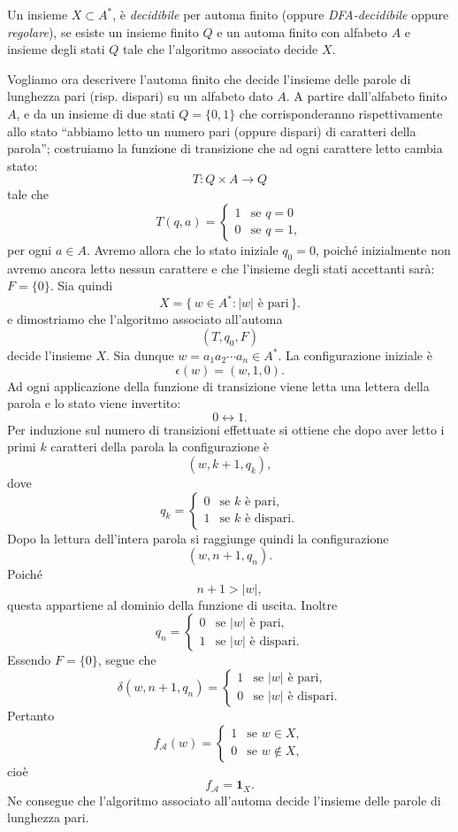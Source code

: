 \begin{defi}\label{def:5}
Un insieme $X\subset A^*$, è \textit{decidibile} per automa finito (oppure \textit{DFA-decidibile} oppure \textit{regolare}), se esiste un insieme finito $Q$ e un automa finito con alfabeto $A$ e insieme degli stati $Q$ tale che l'algoritmo associato decide $X$.
\end{defi}
\begin{exam}\label{ex: parole lunghezze pari}
Vogliamo ora descrivere l'automa finito che decide l'insieme delle parole di lunghezza pari (risp. dispari) su un alfabeto dato $A$.
A partire dall'alfabeto finito $A$, e da un insieme di due stati $Q=\{0,1\}$ che corrisponderanno rispettivamente allo stato ``abbiamo letto un numero pari (oppure dispari) di caratteri della parola''; costruiamo la funzione di transizione che ad ogni carattere letto cambia stato:
\[
T: Q\times A \to Q
\]
tale che
\[
T(q,a) =
\begin{cases}
1 & \text{se } q=0 \\
0 & \text{se } q=1,
\end{cases}
\]
per ogni $a\in A$.
Avremo allora che lo stato iniziale $q_0=0$, poiché inizialmente non avremo ancora letto nessun carattere e che l'insieme degli stati accettanti sarà: $F=\{0\}$.
Sia quindi 
\[
X=\{\,w\in A^* : |w|\text{ è pari}\,\}.
\]
e dimostriamo che l'algoritmo associato all'automa
\[
(T,q_0,F)
\]
decide l'insieme \(X\).
Sia dunque \(w=a_1a_2\cdots a_n\in A^*\). La configurazione iniziale è
\[
\epsilon(w)=(w,1,0).
\]
Ad ogni applicazione della funzione di transizione viene letta una lettera della parola e lo stato viene invertito:
\[
0\longleftrightarrow1.
\]
Per induzione sul numero di transizioni effettuate si ottiene che dopo aver letto i primi \(k\) caratteri della parola la configurazione è
\[
(w,k+1,q_k),
\]
dove
\[
q_k=
\begin{cases}
0 & \text{se } k \text{ è pari},\\
1 & \text{se } k \text{ è dispari}.
\end{cases}
\]
Dopo la lettura dell'intera parola si raggiunge quindi la configurazione
\[
(w,n+1,q_n).
\]
Poiché
\[
n+1>|w|,
\]
questa appartiene al dominio della funzione di uscita. Inoltre
\[
q_n=
\begin{cases}
0 & \text{se } |w| \text{ è pari},\\
1 & \text{se } |w| \text{ è dispari}.
\end{cases}
\]
Essendo \(F=\{0\}\), segue che
\[
\delta(w,n+1,q_n)=
\begin{cases}
1 & \text{se } |w| \text{ è pari},\\
0 & \text{se } |w| \text{ è dispari}.
\end{cases}
\]
Pertanto
\[
f_{\mathcal A}(w)=
\begin{cases}
1 & \text{se } w\in X,\\
0 & \text{se } w\notin X,
\end{cases}
\]
cioè
\[
f_{\mathcal A}=\mathbf 1_X.
\]
Ne consegue che l'algoritmo associato all'automa decide l'insieme delle parole di lunghezza pari.
\end{exam}